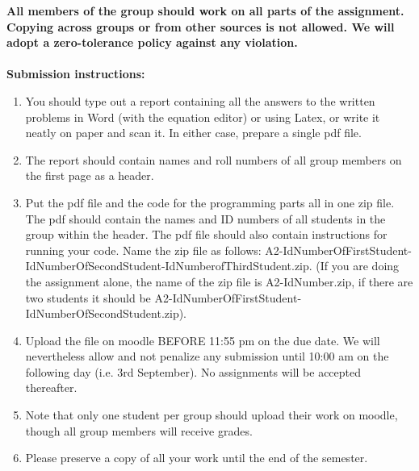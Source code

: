 \documentclass[11pt]{article}
\begin{document}
\maketitle

\textbf{All members of the group should work on all parts of the assignment. Copying across groups or from other sources is not allowed. We will adopt a \textbf{zero-tolerance policy} against any violation.}
\\
\\
\textbf{Submission instructions:} 
\begin{enumerate}
\item You should type out a report containing all the answers to the written problems in Word (with the equation editor) or using Latex, or write it neatly on paper and scan it. In either case, prepare a single pdf file. 
\item The report should contain names and roll numbers of all group members on the first page as a header.
\item Put the pdf file and the code for the programming parts all in one zip file. The pdf should contain the names and ID numbers of all students in the group within the header. The pdf file should also contain instructions for running your code. Name the zip file as follows: A2-IdNumberOfFirstStudent-IdNumberOfSecondStudent-IdNumberofThirdStudent.zip. (If you are doing the assignment alone, the name of the zip file is A2-IdNumber.zip, if there are two students it should be A2-IdNumberOfFirstStudent-IdNumberOfSecondStudent.zip). 
\item Upload the file on moodle BEFORE 11:55 pm on the due date. We will nevertheless allow and not penalize any submission until 10:00 am on the following day (i.e. 3rd September). No assignments will be accepted thereafter. 
\item Note that only one student per group should upload their work on moodle, though all group members will receive grades. 
\item Please preserve a copy of all your work until the end of the semester. 
\end{enumerate}
\end{document}
